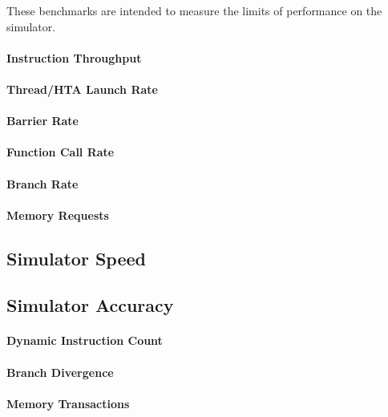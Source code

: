 \documentclass[conference, 10pt]{IEEEtran}
\begin{document}
These benchmarks are intended to measure the limits of performance on the
simulator.

\paragraph{Instruction Throughput}

\paragraph{Thread/HTA Launch Rate}

\paragraph{Barrier Rate}

\paragraph{Function Call Rate}

\paragraph{Branch Rate}

\paragraph{Memory Requests}

\subsection{Simulator Speed}

\subsection{Simulator Accuracy}

\paragraph{Dynamic Instruction Count}

\paragraph{Branch Divergence}

\paragraph{Memory Transactions}
\end{document}
